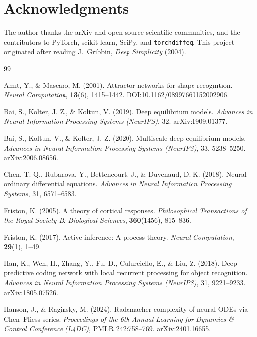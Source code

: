 \documentclass[11pt,a4paper]{article}
\begin{document}
\section*{Acknowledgments}

The author thanks the arXiv and open-source scientific communities, and the contributors
to PyTorch, scikit-learn, SciPy, and \texttt{torchdiffeq}. This project originated after
reading J.~Gribbin, \textit{Deep Simplicity} (2004).

\begin{thebibliography}{99}

Amit, Y., \& Mascaro, M. (2001).
Attractor networks for shape recognition.
\textit{Neural Computation}, \textbf{13}(6), 1415--1442.
DOI:10.1162/08997660152002906.

Bai, S., Kolter, J. Z., \& Koltun, V. (2019).
Deep equilibrium models.
\textit{Advances in Neural Information Processing Systems (NeurIPS)}, 32.
arXiv:1909.01377.

Bai, S., Koltun, V., \& Kolter, J. Z. (2020).
Multiscale deep equilibrium models.
\textit{Advances in Neural Information Processing Systems (NeurIPS)}, 33, 5238--5250.
arXiv:2006.08656.

Chen, T. Q., Rubanova, Y., Bettencourt, J., \& Duvenaud, D. K. (2018).
Neural ordinary differential equations.
\textit{Advances in Neural Information Processing Systems}, 31, 6571--6583.

Friston, K. (2005).
A theory of cortical responses.
\textit{Philosophical Transactions of the Royal Society B: Biological Sciences},
\textbf{360}(1456), 815--836.

Friston, K. (2017).
Active inference: A process theory.
\textit{Neural Computation}, \textbf{29}(1), 1--49.

Han, K., Wen, H., Zhang, Y., Fu, D., Culurciello, E., \& Liu, Z. (2018).
Deep predictive coding network with local recurrent processing for object recognition.
\textit{Advances in Neural Information Processing Systems (NeurIPS)}, 31, 9221--9233.
arXiv:1805.07526.

Hanson, J., \& Raginsky, M. (2024).
Rademacher complexity of neural ODEs via Chen--Fliess series.
\textit{Proceedings of the 6th Annual Learning for Dynamics \& Control Conference (L4DC)},
PMLR 242:758--769.
arXiv:2401.16655.


\end{thebibliography}
\end{document}

